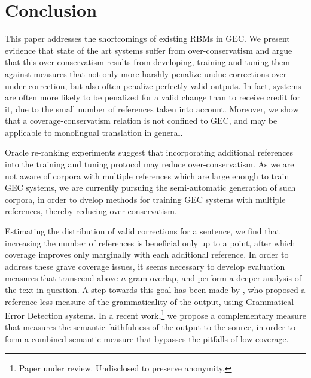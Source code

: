 \documentclass[letterpaper, 11pt]{article}
\begin{document}
\section{Conclusion}\label{sec:conclusion}

This paper addresses the shortcomings of existing RBMs in GEC.
We present evidence that state of the art systems suffer from over-conservatism and
argue that this over-conservatism results from developing, training and tuning them against measures that
not only more harshly penalize undue corrections over under-correction,
but also often penalize perfectly valid outputs.
In fact, systems are often more likely to be penalized for a valid change than 
to receive credit for it, due to the small number of references taken into account.
Moreover, we show that a coverage-conservatism relation is not confined to
GEC, and may be applicable to monolingual translation in general.

Oracle re-ranking experiments suggest that incorporating additional references into the training and tuning
protocol may reduce over-conservatism. 
As we are not aware of corpora with multiple references which are large enough to train GEC systems,
we are currently pursuing the semi-automatic generation of such corpora, in order to dvelop methods
for training GEC systems with multiple references, thereby reducing over-conservatism.

Estimating the distribution of valid corrections for a sentence, we find
that increasing the number of references is beneficial only up to a point, after which
coverage improves only marginally with each additional reference.
In order to address these grave coverage issues, it seems necessary to develop evaluation measures that
transcend above $n$-gram overlap, and perform a deeper analysis of the text in question.
A step towards this goal has been made by , who proposed
a reference-less measure of the grammaticality of the output, using Grammatical Error Detection systems.
In a recent work,\footnote{Paper under review. Undisclosed to preserve anonymity.} we propose a complementary
measure that measures the semantic faithfulness of the output to the source, in order to form a combined
semantic measure that bypasses the pitfalls of low coverage.
\end{document}
